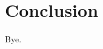 \documentclass[a4paper]{report}
\begin{document}




	\chapter{Conclusion}

	Bye.




\end{document}
